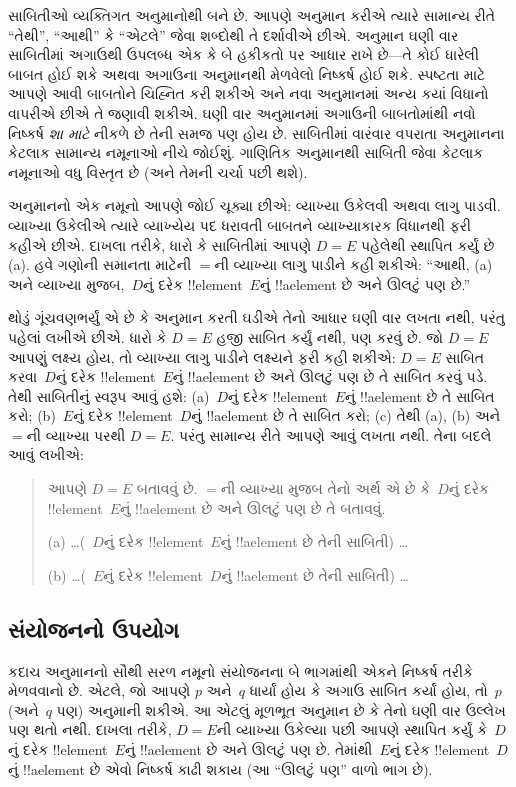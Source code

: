 \documentclass[../../../include/open-logic-section]{subfiles}
\begin{document}


સાબિતીઓ વ્યક્તિગત અનુમાનોથી બને છે. આપણે અનુમાન કરીએ ત્યારે
સામાન્ય રીતે ``તેથી'', ``આથી'' કે ``એટલે'' જેવા શબ્દોથી તે
દર્શાવીએ છીએ. અનુમાન ઘણી વાર સાબિતીમાં અગાઉથી ઉપલબ્ધ એક કે બે
હકીકતો પર આધાર રાખે છે---તે કોઈ ધારેલી બાબત હોઈ શકે અથવા
અગાઉના અનુમાનથી મેળવેલો નિષ્કર્ષ હોઈ શકે. સ્પષ્ટતા માટે આપણે
આવી બાબતોને ચિહ્નિત કરી શકીએ અને નવા અનુમાનમાં અન્ય કયાં વિધાનો
વાપરીએ છીએ તે જણાવી શકીએ. ઘણી વાર અનુમાનમાં અગાઉની બાબતોમાંથી
નવો નિષ્કર્ષ \emph{શા માટે} નીકળે છે તેની સમજ પણ હોય છે.
સાબિતીમાં વારંવાર વપરાતા અનુમાનના કેટલાક સામાન્ય નમૂનાઓ નીચે
જોઈશું. ગાણિતિક અનુમાનથી સાબિતી જેવા કેટલાક નમૂનાઓ વધુ વિસ્તૃત
છે (અને તેમની ચર્ચા પછી થશે).

અનુમાનનો એક નમૂનો આપણે જોઈ ચૂક્યા છીએ: વ્યાખ્યા ઉકેલવી અથવા
લાગુ પાડવી. વ્યાખ્યા ઉકેલીએ ત્યારે વ્યાખ્યેય પદ ધરાવતી બાબતને
વ્યાખ્યાકારક વિધાનથી ફરી કહીએ છીએ. દાખલા તરીકે, ધારો કે સાબિતીમાં
આપણે $D = E$ પહેલેથી સ્થાપિત કર્યું છે (a). હવે ગણોની સમાનતા
માટેની $=$ની વ્યાખ્યા લાગુ પાડીને કહી શકીએ: ``આથી, (a) અને
વ્યાખ્યા મુજબ,~$D$નું દરેક !!{element}~$E$નું !!a{element} છે
અને ઊલટું પણ છે.''

થોડું ગૂંચવણભર્યું એ છે કે અનુમાન કરતી ઘડીએ તેનો આધાર ઘણી વાર
લખતા નથી, પરંતુ પહેલાં લખીએ છીએ. ધારો કે $D = E$ હજી સાબિત
કર્યું નથી, પણ કરવું છે. જો $D = E$ આપણું લક્ષ્ય હોય, તો
વ્યાખ્યા લાગુ પાડીને લક્ષ્યને ફરી કહી શકીએ: $D = E$ સાબિત
કરવા~$D$નું દરેક !!{element}~$E$નું !!a{element} છે અને
ઊલટું પણ છે તે સાબિત કરવું પડે. તેથી સાબિતીનું સ્વરૂપ આવું હશે:
(a)~$D$નું દરેક !!{element}~$E$નું !!a{element} છે તે સાબિત
કરો; (b)~$E$નું દરેક !!{element}~$D$નું !!a{element} છે તે
સાબિત કરો; (c) તેથી (a), (b) અને $=$ની વ્યાખ્યા પરથી $D = E$.
પરંતુ સામાન્ય રીતે આપણે આવું લખતા નથી. તેના બદલે આવું લખીએ:
\begin{quote}
આપણે $D = E$ બતાવવું છે. $=$ની વ્યાખ્યા મુજબ તેનો અર્થ
એ છે કે~$D$નું દરેક !!{element}~$E$નું !!a{element} છે અને
ઊલટું પણ છે તે બતાવવું.

(a) \dots (~$D$નું દરેક !!{element}~$E$નું !!a{element} છે
તેની સાબિતી) \dots

(b) \dots (~$E$નું દરેક !!{element}~$D$નું !!a{element} છે
તેની સાબિતી) \dots
\end{quote}

\subsection{સંયોજનનો ઉપયોગ}

કદાચ અનુમાનનો સૌથી સરળ નમૂનો સંયોજનના બે ભાગમાંથી એકને
નિષ્કર્ષ તરીકે મેળવવાનો છે. એટલે, જો આપણે $p$ અને~$q$ ધાર્યાં
હોય કે અગાઉ સાબિત કર્યાં હોય, તો~$p$ (અને~$q$ પણ) અનુમાની
શકીએ. આ એટલું મૂળભૂત અનુમાન છે કે તેનો ઘણી વાર ઉલ્લેખ પણ
થતો નથી. દાખલા તરીકે, $D = E$ની વ્યાખ્યા ઉકેલ્યા પછી આપણે
સ્થાપિત કર્યું કે~$D$નું દરેક !!{element}~$E$નું !!a{element}
છે અને ઊલટું પણ છે. તેમાંથી~$E$નું દરેક !!{element}~$D$નું
!!a{element} છે એવો નિષ્કર્ષ કાઢી શકાય (આ ``ઊલટું પણ'' વાળો ભાગ છે).
\end{document}
